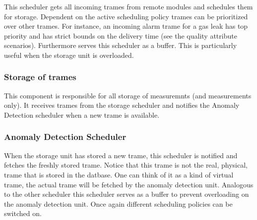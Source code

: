 \npar This scheduler gets all incoming trames from remote modules and schedules
them for storage. Dependent on the active scheduling policy trames can be
prioritized over other trames. For instance, an incoming alarm trame for a gas
leak has top priority and has strict bounds on the delivery time (see the
quality attribute scenarios). Furthermore serves this scheduler as a buffer.
This is particularly useful when the storage unit is overloaded.


\subsubsection{Storage of trames}

\npar This component is responsible for all storage of measuremnts (and
measurements only). It receives trames from the storage scheduler and notifies
the Anomaly Detection scheduler when a new trame is available.


\subsubsection{Anomaly Detection Scheduler}

\npar When the storage unit has stored a new trame, this scheduler is notified
and fetches the freshly stored trame. Notice that this trame is not
the real, physical, trame that is stored in the datbase. One can think of it as
a kind of virtual trame, the actual trame will be fetched by the anomaly
detection unit. Analogous to the other scheduler this scheduler serves as a
buffer to prevent overloading on the anomaly detection unit. Once again
different scheduling policies can be switched on.

